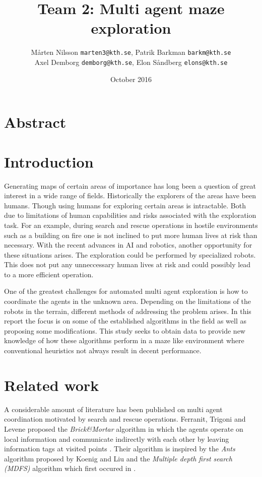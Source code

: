 \documentclass{article}
\title{Team 2: Multi agent maze exploration}
\author{ Mårten Nilsson \texttt{marten3@kth.se}, Patrik Barkman
  \texttt{barkm@kth.se} \\ Axel Demborg \texttt{demborg@kth.se}, Elon Såndberg
  \texttt{elons@kth.se}}
\date{October 2016}
\begin{document}
\maketitle

\section{Abstract}

\section{Introduction}

Generating maps of certain areas of importance has long been a question of great interest in a
wide range of fields. Historically the explorers of the areas have been humans.
Though using humans for exploring certain areas is intractable. Both due to
limitations of human capabilities and risks associated with the exploration
task. For an example, during search and rescue operations in hostile
environments such as a building on fire one is not inclined to put more human
lives at risk than necessary. With the recent advances in AI and robotics,
another opportunity for these situations arises. The exploration could be
performed by specialized robots. This does not put any unneccessary human lives
at risk and could possibly lead to a more efficient operation.

One of the greatest challenges for automated multi agent exploration is how to
coordinate the agents in the unknown area. Depending on the limitations of the
robots in the terrain, different methods of addressing the problem arises. In
this report the focus is on some of the established algorithms in the field as
well as proposing some modifications. This study seeks to obtain data to provide
new knowledge of how these algorithms perform in a maze like environment where
conventional heuristics not always result in decent performance.

\section{Related work}
A considerable amount of literature has been published on multi agent
coordination motivated by search and rescue operations. Ferranit, Trigoni and
Levene proposed the \textit{Brick\&Mortar} algorithm in which the agents operate
on local information and communicate indirectly with each other by leaving
information tags at visited points \cite{ferranti2007brick}. Their algorithm is
inspired by the \textit{Ants} algorithm proposed by Koenig and Liu \cite{koenig2001terrain} and the
\textit{Multiple depth first search (MDFS)} algorithm which first occured in \cite{tarry1895probleme}. 
\end{document}
